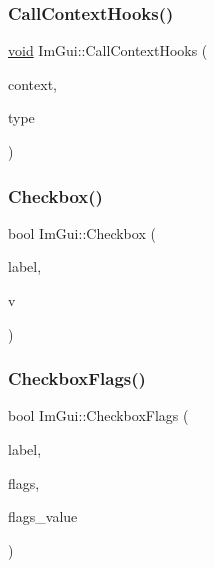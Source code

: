 \mbox{\label{namespaceImGui_a61ced7f0dd38c604e895400a2e5eeeb2}} 
\subsubsection{\texorpdfstring{Call\+Context\+Hooks()}{CallContextHooks()}}
{\footnotesize\ttfamily \hyperlink{imgui__impl__opengl3__loader_8h_ac668e7cffd9e2e9cfee428b9b2f34fa7}{void} Im\+Gui\+::\+Call\+Context\+Hooks (\begin{DoxyParamCaption}\item[{\hyperlink{structImGuiContext}{Im\+Gui\+Context} $\ast$}]{context,  }\item[{\hyperlink{imgui__internal_8h_a00ee5484f4006a8b98ed323d1dc37944}{Im\+Gui\+Context\+Hook\+Type}}]{type }\end{DoxyParamCaption})}

\mbox{\label{namespaceImGui_a57d73c1d0ef807fef734d91024092027}} 
\subsubsection{\texorpdfstring{Checkbox()}{Checkbox()}}
{\footnotesize\ttfamily bool Im\+Gui\+::\+Checkbox (\begin{DoxyParamCaption}\item[{const char $\ast$}]{label,  }\item[{bool $\ast$}]{v }\end{DoxyParamCaption})}

\mbox{\label{namespaceImGui_ab40105d09d9fa234721901da6e196a65}} 
\subsubsection{\texorpdfstring{Checkbox\+Flags()}{CheckboxFlags()}\hspace{0.1cm}{\footnotesize\ttfamily [1/4]}}
{\footnotesize\ttfamily bool Im\+Gui\+::\+Checkbox\+Flags (\begin{DoxyParamCaption}\item[{const char $\ast$}]{label,  }\item[{int $\ast$}]{flags,  }\item[{int}]{flags\+\_\+value }\end{DoxyParamCaption})}

